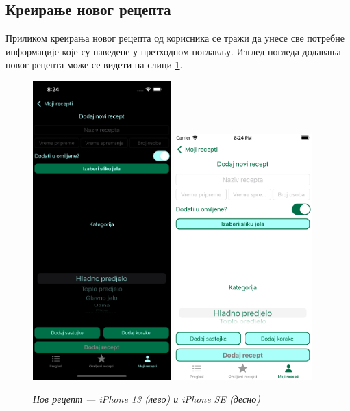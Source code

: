 \documentclass[12pt,oneside]{memoir}
\begin{document}
\subsection{Креирање новог рецепта}
\label{subsec:Креирање новог рецепта}

\indent Приликом креирања новог рецепта од корисника се тражи да унесе све потребне информације које су наведене у претходном поглављу. Изглед погледа додавања новог рецепта може се видети на слици \ref{slika:нов_рецепт_1}.

\begin{figure} [H]
    \centering
    \captionsetup{justification=centering}
    \includegraphics[width=0.475\textwidth]{images/simulators/view images/dark - new.png} 
    \hfill
    \includegraphics[width=0.475\textwidth]{images/simulators/view images/light - new.png} 
    \caption{\textit{Нов рецепт --- iPhone 13 (лево) и iPhone SE (десно)}}
    \label{slika:нов_рецепт_1}
\end{figure}
\end{document}
